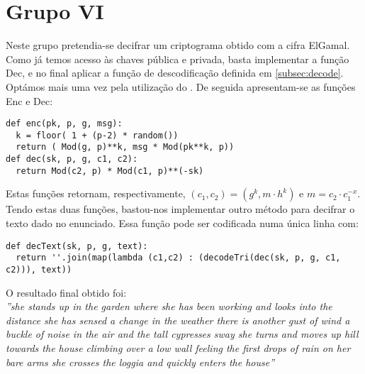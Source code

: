 \chapter{Grupo VI}
Neste grupo pretendia-se decifrar um criptograma obtido com a cifra ElGamal. Como já temos acesso às chaves pública e privada, basta implementar a função \textsf{Dec}, e no final aplicar a função de descodificação definida em \ref{subsec:decode}. Optámos mais uma vez pela utilização do \sage. De seguida apresentam-se as funções \textsf{Enc} e \textsf{Dec}:
\begin{lstlisting}[style=sage]
def enc(pk, p, g, msg):
  k = floor( 1 + (p-2) * random())
  return ( Mod(g, p)**k, msg * Mod(pk**k, p))
def dec(sk, p, g, c1, c2):
  return Mod(c2, p) * Mod(c1, p)**(-sk)
\end{lstlisting}
Estas funções retornam, respectivamente, $(c_1,c_2) = (g^k, m \cdot h^k)$ e $m = c_2 \cdot c_1^{-x}$.\\
Tendo estas duas funções, bastou-nos implementar outro método para decifrar o texto dado no enunciado. Essa função pode ser codificada numa única linha com:
\begin{lstlisting}[style=sage]
def decText(sk, p, g, text):
  return ''.join(map(lambda (c1,c2) : (decodeTri(dec(sk, p, g, c1, c2))), text))
\end{lstlisting}
O resultado final obtido foi:\\
\textit{''she stands up in the garden where she has been working and looks into the distance she has sensed a change in the weather there is another gust of wind a buckle of noise in the air and the tall cypresses sway she turns and moves up hill towards the house climbing over a low wall feeling the first drops of rain on her bare arms she crosses the loggia and quickly enters the house''}